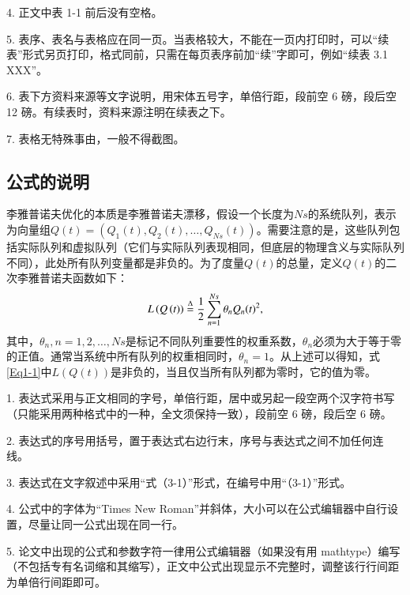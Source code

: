\textcolor[rgb]{1.00,0.00,0.00}{4. 正文中表 1-1 前后没有空格。}

\textcolor[rgb]{1.00,0.00,0.00}{5. 表序、表名与表格应在同一页。当表格较大，不能在一页内打印时，可以“续表”形式另页打印，格式同前，只需在每页表序前加“续”字即可，例如“续表 3.1 XXX”。}

\textcolor[rgb]{1.00,0.00,0.00}{6. 表下方资料来源等文字说明，用宋体五号字，单倍行距，段前空 6 磅，段后空 12 磅。有续表时，资料来源注明在续表之下。}

\textcolor[rgb]{1.00,0.00,0.00}{7. 表格无特殊事由，一般不得截图。}

\subsection{公式的说明}

李雅普诺夫优化的本质是李雅普诺夫漂移，假设一个长度为$Ns$的系统队列，表示为向量组$Q\left( t \right) = \left( {{Q_1}\left( t \right),{Q_2}\left( t \right), \ldots ,{Q_{Ns}}\left( t \right)} \right)$。需要注意的是，这些队列包括实际队列和虚拟队列（它们与实际队列表现相同，但底层的物理含义与实际队列不同），此处所有队列变量都是非负的。为了度量$Q\left( t \right)$的总量，定义$Q\left( t \right)$的二次李雅普诺夫函数如下：
\begin{equation}\label{Eq1-1}
L\left( {Q\left( t \right)} \right) \buildrel \Delta \over = \frac{1}{2}\sum\limits_{n = 1}^{Ns} {{\theta _n}{Q_n}{{\left( t \right)}^2}},
\end{equation}
其中，${\theta _n},n = 1,2, \ldots ,Ns$是标记不同队列重要性的权重系数，${\theta _n}$必须为大于等于零的正值。通常当系统中所有队列的权重相同时，${\theta _n} = 1$。从上述可以得知，式\eqref{Eq1-1}中$L\left( {Q\left( t \right)} \right)$是非负的，当且仅当所有队列都为零时，它的值为零。

\textcolor[rgb]{1.00,0.00,0.00}{1. 表达式采用与正文相同的字号，单倍行距，居中或另起一段空两个汉字符书写（只能采用两种格式中的一种，全文须保持一致），段前空 6 磅，段后空 6 磅。}

\textcolor[rgb]{1.00,0.00,0.00}{2. 表达式的序号用括号，置于表达式右边行末，序号与表达式之间不加任何连线。}

\textcolor[rgb]{1.00,0.00,0.00}{3. 表达式在文字叙述中采用“式（3-1）”形式，在编号中用“（3-1）”形式。}

\textcolor[rgb]{1.00,0.00,0.00}{4. 公式中的字体为“Times New Roman”并斜体，大小可以在公式编辑器中自行设置，尽量让同一公式出现在同一行。}

\textcolor[rgb]{1.00,0.00,0.00}{5. 论文中出现的公式和参数字符一律用公式编辑器（如果没有用 mathtype）编写（不包括专有名词缩和其缩写），正文中公式出现显示不完整时，调整该行行间距为单倍行间距即可。}

